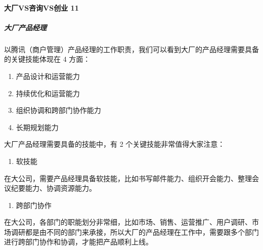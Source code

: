 \documentclass[letterpaper,11pt,english]{sphinxmanual}
\begin{document}
\paragraph{大厂VS咨询VS创业 11\sphinxfootnotemark[57]}
\label{\detokenize{chapter_introduction/PM:vsvs-11}}%
\begin{footnotetext}[57]\sphinxAtStartFootnote
{}
%
\end{footnotetext}\ignorespaces 

\subparagraph{大厂产品经理}
\label{\detokenize{chapter_introduction/PM:id17}}
以腾讯（商户管理）产品经理的工作职责，我们可以看到大厂的产品经理需要具备的关键技能体现在
4 方面：
\begin{enumerate}
%
\item {} 
产品设计和运营能力

\item {} 
持续优化和运营能力

\item {} 
组织协调和跨部门协作能力

\item {} 
长期规划能力

\end{enumerate}

大厂产品经理需要具备的技能中，有 2 个关键技能非常值得大家注意：
\begin{enumerate}
%
\item {} 
软技能

\end{enumerate}

在大公司，需要产品经理具备软技能，比如书写邮件能力、组织开会能力、整理会议纪要能力、协调资源能力。
\begin{enumerate}
%
\setcounter{enumi}{1}
\item {} 
跨部门协作

\end{enumerate}

在大公司，各部门的职能划分非常细，比如市场、销售、运营推广、用户调研、市场调研都是由不同的部门来承接，所以大厂的产品经理在工作中，需要跟多个部门进行跨部门协作和协调，才能把产品顺利上线。
\end{document}
